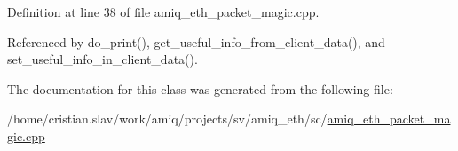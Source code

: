 Definition at line 38 of file amiq\_\-eth\_\-packet\_\-magic.cpp.

Referenced by do\_\-print(), get\_\-useful\_\-info\_\-from\_\-client\_\-data(), and set\_\-useful\_\-info\_\-in\_\-client\_\-data().

The documentation for this class was generated from the following file:\begin{DoxyCompactItemize}
\item 
/home/cristian.slav/work/amiq/projects/sv/amiq\_\-eth/sc/\hyperlink{amiq__eth__packet__magic_8cpp}{amiq\_\-eth\_\-packet\_\-magic.cpp}\end{DoxyCompactItemize}

